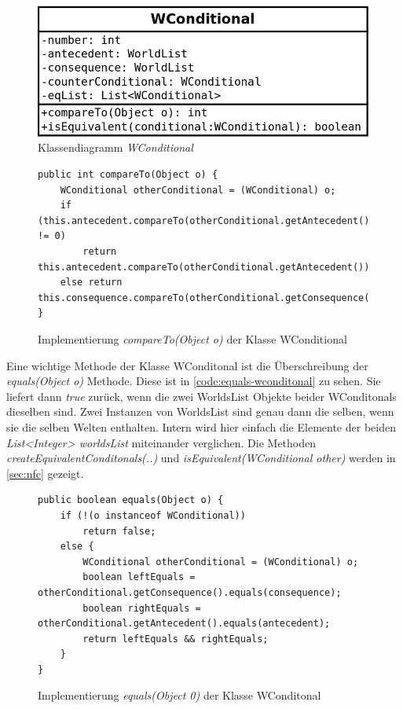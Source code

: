 \documentclass[12pt,a4paper]{article}
\begin{document}
\begin{figure}
\includegraphics[width=0.55\linewidth]{bilder/wconditional.png}
\caption{Klassendiagramm \textit{WConditional}}
\label{pic:wconditional}
\end{figure}



\begin{figure}
\begin{lstlisting}
public int compareTo(Object o) {
    WConditional otherConditional = (WConditional) o;
    if (this.antecedent.compareTo(otherConditional.getAntecedent()) != 0)
        return this.antecedent.compareTo(otherConditional.getAntecedent());
    else return this.consequence.compareTo(otherConditional.getConsequence());
}
\end{lstlisting}
\caption{Implementierung \textit{compareTo(Object o)} der Klasse WConditional}
\label{code:compare-wconditonal}
\end{figure}







Eine wichtige Methode der Klasse WConditonal ist die Überschreibung der \textit{equals(Object o)} Methode. Diese ist in \autoref{code:equals-wconditonal} zu sehen. Sie liefert dann \textit{true} zurück, wenn die zwei WorldsList Objekte beider WConditonals dieselben sind. Zwei Instanzen von WorldsList sind genau dann die selben, wenn sie die selben Welten enthalten. Intern wird hier einfach die Elemente der beiden \textit{List<Integer> worldsList} miteinander verglichen. 
Die Methoden \textit{createEquivalentConditonals(..)} und \textit{isEquivalent(WConditional other)} werden in \autoref{sec:nfc} gezeigt.


\begin{figure}
\begin{lstlisting}
public boolean equals(Object o) {
    if (!(o instanceof WConditional))
        return false;
    else {
        WConditional otherConditional = (WConditional) o;
        boolean leftEquals = otherConditional.getConsequence().equals(consequence);
        boolean rightEquals = otherConditional.getAntecedent().equals(antecedent);
        return leftEquals && rightEquals;
    }
}
\end{lstlisting}
\caption{Implementierung \textit{equals(Object 0)} der Klasse WConditonal}
\label{code:equals-wconditonal}
\end{figure}
\end{document}
